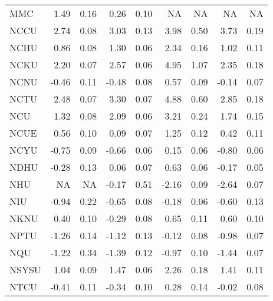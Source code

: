 \begin{longtable}[t]{lrrrrrrrr}
\hspace{1em}MMC & 1.49 & 0.16 & 0.26 & 0.10 & NA & NA & NA & NA\\
\hspace{1em}NCCU & 2.74 & 0.08 & 3.03 & 0.13 & 3.98 & 0.50 & 3.73 & 0.19\\
\hspace{1em}NCHU & 0.86 & 0.08 & 1.30 & 0.06 & 2.34 & 0.16 & 1.02 & 0.11\\
\hspace{1em}NCKU & 2.20 & 0.07 & 2.57 & 0.06 & 4.95 & 1.07 & 2.35 & 0.18\\
\hspace{1em}NCNU & -0.46 & 0.11 & -0.48 & 0.08 & 0.57 & 0.09 & -0.14 & 0.07\\
\hspace{1em}NCTU & 2.48 & 0.07 & 3.30 & 0.07 & 4.88 & 0.60 & 2.85 & 0.18\\
\hspace{1em}NCU & 1.32 & 0.08 & 2.09 & 0.06 & 3.21 & 0.24 & 1.74 & 0.15\\
\hspace{1em}NCUE & 0.56 & 0.10 & 0.09 & 0.07 & 1.25 & 0.12 & 0.42 & 0.11\\
\hspace{1em}NCYU & -0.75 & 0.09 & -0.66 & 0.06 & 0.15 & 0.06 & -0.80 & 0.06\\
\hspace{1em}NDHU & -0.28 & 0.13 & 0.06 & 0.07 & 0.63 & 0.06 & -0.17 & 0.05\\
\hspace{1em}NHU & NA & NA & -0.17 & 0.51 & -2.16 & 0.09 & -2.64 & 0.07\\
\hspace{1em}NIU & -0.94 & 0.22 & -0.65 & 0.08 & -0.18 & 0.06 & -0.60 & 0.13\\
\hspace{1em}NKNU & 0.40 & 0.10 & -0.29 & 0.08 & 0.65 & 0.11 & 0.60 & 0.10\\
\hspace{1em}NPTU & -1.26 & 0.14 & -1.12 & 0.13 & -0.12 & 0.08 & -0.98 & 0.07\\
\hspace{1em}NQU & -1.22 & 0.34 & -1.39 & 0.12 & -0.97 & 0.10 & -1.44 & 0.07\\
\hspace{1em}NSYSU & 1.04 & 0.09 & 1.47 & 0.06 & 2.26 & 0.18 & 1.41 & 0.11\\
\hspace{1em}NTCU & -0.41 & 0.11 & -0.34 & 0.10 & 0.28 & 0.14 & -0.02 & 0.08\\

\end{longtable}
